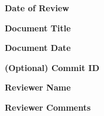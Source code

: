\documentclass{report}
\begin{document}
\textbf{Date of Review}


\textbf{Document Title}


\textbf{Document Date}


\textbf{(Optional) Commit ID}


\textbf{Reviewer Name}



\textbf{Reviewer Comments}
\end{document}
